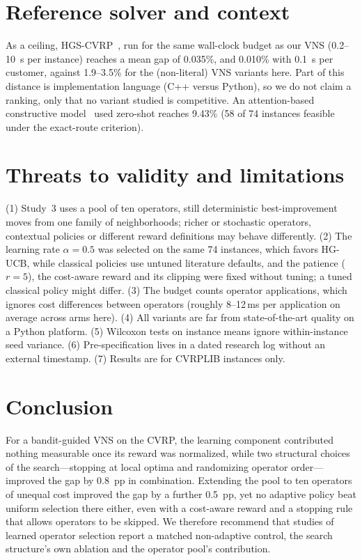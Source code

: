 \documentclass[conference]{IEEEtran}
\begin{document}
\section{Reference solver and context}
As a ceiling, HGS-CVRP~\cite{vidal2022}, run for the same wall-clock budget as our VNS (0.2--10~s per instance) reaches a mean gap of 0.035\%, and 0.010\% with 0.1~s per customer, against 1.9--3.5\% for the (non-literal) VNS variants here. Part of this distance is implementation language (C++ versus Python), so we do not claim a ranking, only that no variant studied is competitive. An attention-based constructive model~\cite{kool2019} used zero-shot reaches 9.43\% (58 of 74 instances feasible under the exact-route criterion).

\section{Threats to validity and limitations}\label{sec:threats}
(1) Study~3 uses a pool of ten operators, still deterministic best-improvement moves from one family of neighborhoods; richer or stochastic operators, contextual policies or different reward definitions may behave differently. (2) The learning rate $\alpha=0.5$ was selected on the same 74 instances, which favors HG-UCB, while classical policies use untuned literature defaults, and the patience ($r=5$), the cost-aware reward and its clipping were fixed without tuning; a tuned classical policy might differ. (3) The budget counts operator applications, which ignores cost differences between operators (roughly 8--12\,ms per application on average across arms here). (4) All variants are far from state-of-the-art quality on a Python platform. (5) Wilcoxon tests on instance means ignore within-instance seed variance. (6) Pre-specification lives in a dated research log without an external timestamp. (7) Results are for CVRPLIB instances only.

\section{Conclusion}
For a bandit-guided VNS on the CVRP, the learning component contributed nothing measurable once its reward was normalized, while two structural choices of the search---stopping at local optima and randomizing operator order---improved the gap by 0.8~pp in combination. Extending the pool to ten operators of unequal cost improved the gap by a further 0.5~pp, yet no adaptive policy beat uniform selection there either, even with a cost-aware reward and a stopping rule that allows operators to be skipped. We therefore recommend that studies of learned operator selection report a matched non-adaptive control, the search structure's own ablation and the operator pool's contribution.




\end{document}
